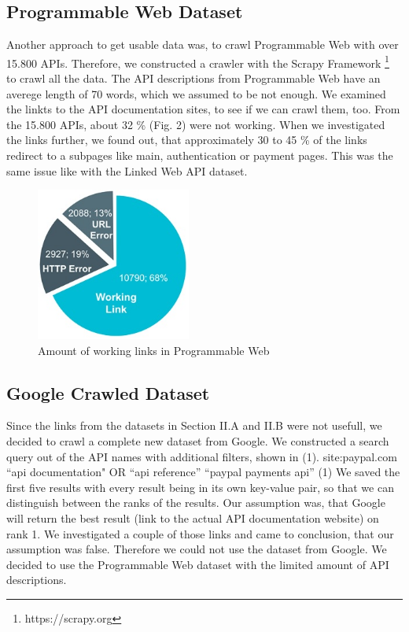 \documentclass[a4paper]{IEEEtran}
\begin{document}
\subsection{Programmable Web Dataset}
Another approach to get usable data was, to crawl Programmable Web with over 15.800 APIs. Therefore, we constructed a crawler with the Scrapy Framework \footnote[2]{https://scrapy.org} to crawl all the data. The API descriptions from Programmable Web have an averege length of 70 words, which we assumed to be not enough. We examined the linkts to the API documentation sites, to see if we can crawl them, too. From the 15.800 APIs, about 32 \% (Fig. 2) were not working. When we investigated the links further, we found out, that approximately 30 to 45 \% of the links redirect to a subpages like  main, authentication or payment pages. This was the same issue like with the Linked Web API dataset.
\begin{figure}[h]
\centering
\includegraphics[width= 2in]{img/pie.png}
\caption{Amount of working links in Programmable Web}
\label{fig_sim}
\end{figure}

\subsection{Google Crawled Dataset}
Since the links from the datasets in Section II.A and II.B were not usefull, we decided to crawl a complete new dataset from Google. We constructed a search query out of the API names with additional filters, shown in (1).
site:paypal.com “api documentation" OR “api reference” “paypal payments api”	(1)
We saved the first five results with every result being in its own key-value pair, so that we can distinguish between the ranks of the results. Our assumption was, that Google will return the best result (link to the actual API documentation website) on rank 1. We investigated a couple of those links and came to conclusion, that our assumption was false. Therefore we could not use the dataset from Google.
We decided to use the Programmable Web dataset with the limited amount of API descriptions.
\end{document}
